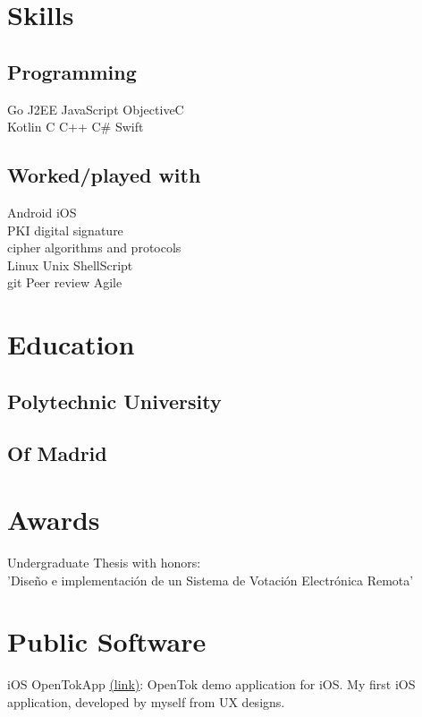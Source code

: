 \documentclass[]{resume}
\begin{document}
\begin{minipage}[t]{0.33\textwidth}


\section{Skills}
\subsection{Programming}
Go \textbullet{} J2EE \textbullet{} JavaScript \textbullet{} ObjectiveC \\
Kotlin \textbullet{} C \textbullet{} C++ \textbullet{} C\# \textbullet{} Swift \\
\sectionsep
\subsection{Worked/played with}
Android \textbullet{} iOS \\
PKI \textbullet{} digital signature \\
cipher algorithms and protocols \\
Linux \textbullet{} Unix \textbullet{} ShellScript \\
git \textbullet{} Peer review \textbullet{} Agile
\sectionsep

\section{Education}
\subsection{Polytechnic University}
\subsection{Of Madrid}
\sectionsep

\section{Awards}
Undergraduate Thesis with honors:\\
'Diseño e implementación de un Sistema de Votación Electrónica Remota'\\
\sectionsep


\section{Public Software}
\textbullet{} iOS OpenTokApp \href{https://itunes.apple.com/us/app/opentokapp/id1106222570?mt=8}{{\underline{(link)}}}:
OpenTok demo application for iOS. My first iOS application, developed by myself from UX designs.



\end{minipage}
\end{document}
